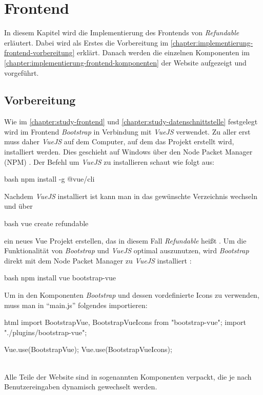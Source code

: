 \section{Frontend}
\label{chapter:implementierung-frontend}
In diesem Kapitel wird die Implementierung des Frontends von \textit{Refundable} erläutert. Dabei wird als Erstes die Vorbereitung im \autoref{chapter:implementierung-frontend-vorbereitung} erklärt. Danach werden die einzelnen Komponenten im \autoref{chapter:implementierung-frontend-komponenten} der Website aufgezeigt und vorgeführt.
\subsection{Vorbereitung}
\label{chapter:implementierung-frontend-vorbereitung}
Wie im \autoref{chapter:study-frontend} und \autoref{chapter:study-datenschnittstelle} festgelegt wird im Frontend \textit{Bootstrap} in Verbindung mit \textit{VueJS} verwendet. Zu aller erst muss daher \textit{VueJS} auf dem Computer, auf dem das Projekt erstellt wird, installiert werden. Dies geschieht auf Windows über den Node Packet Manager (NPM) \cite{vue-install}. Der Befehl um \textit{VueJS} zu installieren schaut wie folgt aus:
\begin{code}{bash}
	npm install -g @vue/cli
\end{code}
Nachdem \textit{VueJS} installiert ist kann man in das gewünschte Verzeichnis wechseln und über
\begin{code}{bash}
	vue create refundable
\end{code}
ein neues Vue Projekt erstellen, das in diesem Fall \textit{Refundable} heißt \cite{vue-create-project}. Um die Funktionalität von \textit{Bootstrap} und \textit{VueJS} optimal auszunutzen, wird \textit{Bootstrap} direkt mit dem Node Packet Manager zu \textit{VueJS} installiert \cite{bootstrap-vue-getting-started}:
\begin{code}{bash}
	npm install vue bootstrap-vue
\end{code}
Um in den Komponenten \textit{Bootstrap} und dessen vordefinierte Icons zu verwenden, muss man in \enquote{main.js} folgendes importieren:
\begin{code}{html}
	import { BootstrapVue, BootstrapVueIcons } from "bootstrap-vue";
	import "./plugins/bootstrap-vue";
	
	Vue.use(BootstrapVue);
	Vue.use(BootstrapVueIcons);
\end{code}
	\label{list:requcommands} ~\\
Alle Teile der Website sind in sogenannten Komponenten verpackt, die je nach Benutzereingaben dynamisch gewechselt werden. 

